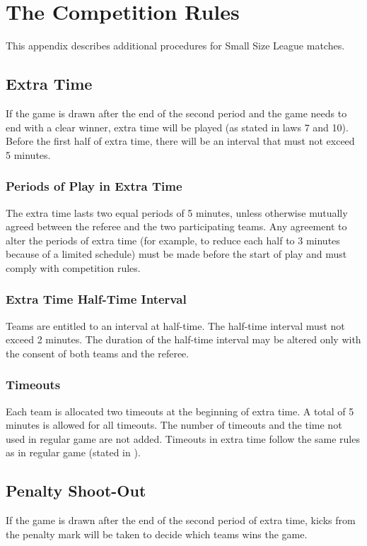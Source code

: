 \section{The Competition Rules}\label{app:competition-rules}

This appendix describes additional procedures for Small Size League matches.

\subsection{Extra Time}
If the game is drawn after the end of the second period and the game needs to end with a clear winner, extra time will be played (as stated in laws 7 and 10).
Before the first half of extra time, there will be an interval that must not exceed 5 minutes.

\subsubsection{Periods of Play in Extra Time}
The extra time lasts two equal periods of 5 minutes, unless otherwise mutually agreed between the referee and the two participating teams.
Any agreement to alter the periods of extra time (for example, to reduce each half to 3 minutes because of a limited schedule) must be made before the start of play and must comply with competition rules.

\subsubsection{Extra Time Half-Time Interval}
Teams are entitled to an interval at half-time.
The half-time interval must not exceed 2 minutes.
The duration of the half-time interval may be altered only with the consent of both teams and the referee.

\subsubsection{Timeouts}
Each team is allocated two timeouts at the beginning of extra time.
A total of 5 minutes is allowed for all timeouts.
The number of timeouts and the time not used in regular game are not added.
Timeouts in extra time follow the same rules as in regular game (stated in ).

\subsection{Penalty Shoot-Out}
If the game is drawn after the end of the second period of extra time, kicks from the penalty mark will be taken to decide which teams wins the game.

